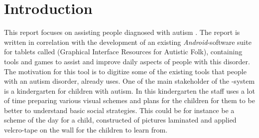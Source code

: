 \chapter{Introduction}
\label{cha:introduction}


This report focuses on assisting people diagnosed with autism . The report is written in correlation with the development of an existing \emph{Android}-software suite for tablets called \giraf(Graphical Interface Resources for Autistic Folk), containing tools and games to assist and improve daily aspects of people with this disorder. The motivation for this tool is to digitize some of the existing tools that people with an autism disorder, already uses. One of the main stakeholder of the \giraf-system is a kindergarten for children with autism. In this kindergarten the staff uses a lot of time preparing various visual schemes and plans for the children for them to be better to understand basic social strategies. This could be for instance be a scheme of the day for a child, constructed of pictures laminated and applied velcro-tape on the wall for the children to learn from.



